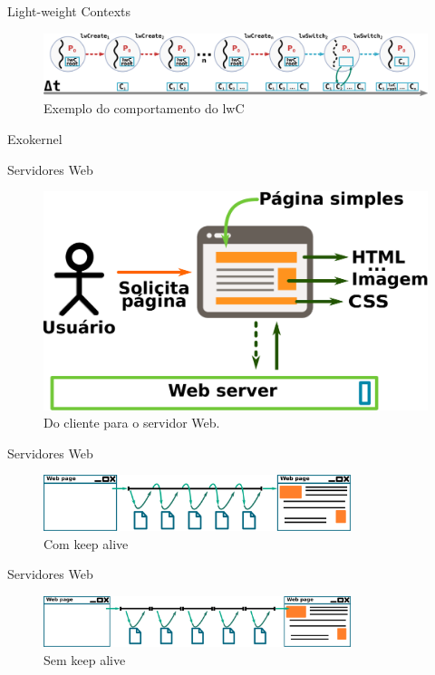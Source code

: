 \documentclass[xcolor={usenames,svgnames,dvipsnames},brazil,english,12pt,aspectratio=149]{beamer}
\begin{document}
\begin{frame}{Light-weight Contexts}
	\begin{figure}[!h]
		\centering
		\includegraphics[width=\textwidth]{lwC} 
		\caption{Exemplo do comportamento do lwC}
		\label{fig:lwc} 
	\end{figure}
\end{frame}

\begin{frame}{Exokernel}
\end{frame}

\begin{frame}{Servidores Web}
	\begin{figure}[!h]
		\centering
		\includegraphics[width=.50\textwidth]{request_a_page}
		\caption{Do cliente para o servidor Web.}
		\label{fig:client_to_web_server}
	\end{figure}
\end{frame}

\begin{frame}{Servidores Web}
	\begin{figure}[!h]
		\centering
		\includegraphics[width=0.8\textwidth]{keep_alive}
		\caption{Com keep alive}
		\label{fig:keep_alive}
	\end{figure}
\end{frame}

\begin{frame}{Servidores Web}
	\begin{figure}[!h]
		\centering
		\includegraphics[width=0.8\textwidth]{no_keep_alive}
		\caption{Sem keep alive}
		\label{fig:no_keep_alive}
	\end{figure}
\end{frame}
\end{document}
